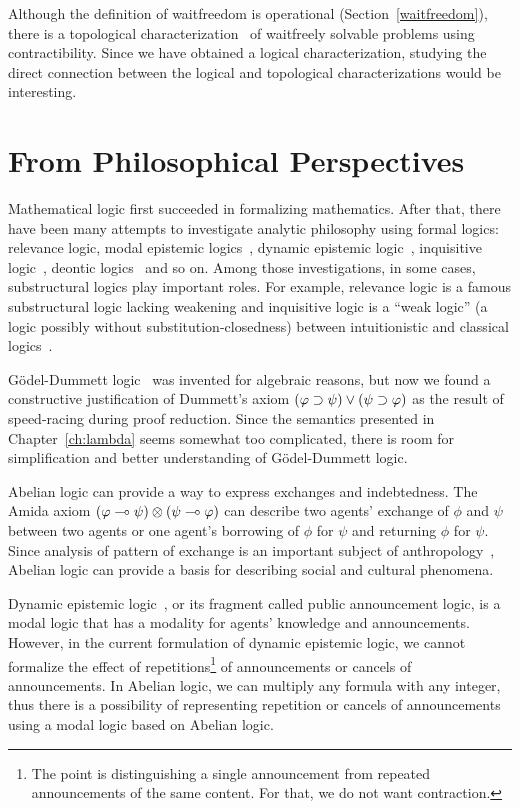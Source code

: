 Although the definition of waitfreedom is operational
(Section~\ref{waitfreedom}),
there is a topological characterization~\citep{Herlihy99,Saks:1993vq} of
waitfreely solvable problems using contractibility.
Since we have obtained a logical characterization, studying the direct
connection between the logical and topological characterizations would
be interesting.

\section{From Philosophical Perspectives}

Mathematical logic first succeeded in formalizing mathematics.
After that, there have been many attempts to investigate analytic
philosophy
using formal logics: relevance logic, modal epistemic
logics~\citep{sep-logic-epistemic},
dynamic epistemic logic~\citep{ditmarsch2007dynamic},
inquisitive logic~\citep{ciardelli2011},
deontic logics~\citep{von1951deontic} and
so on.  Among those investigations, in some cases, substructural logics
play important roles.  For example, relevance logic is a famous
substructural logic lacking weakening and inquisitive logic is a ``weak
logic'' (a logic possibly without substitution-closedness) between
intuitionistic and classical logics~\citep{ciardelli2011}.

G\"odel-Dummett logic~\citep{dummett59} was invented for algebraic
reasons, but now we found a constructive justification of Dummett's axiom
$(\varphi\supset\psi)\lor(\psi\supset\varphi)$ as the result of speed-racing during
proof reduction.  Since the semantics presented in
Chapter~\ref{ch:lambda} seems somewhat too complicated,
there is room for simplification and better understanding of
G\"odel-Dummett logic.

Abelian logic can provide a way to express
exchanges and indebtedness.
The Amida axiom $(\varphi\multimap
\psi)\otimes(\psi\multimap\varphi)$
can describe two agents' exchange of $\phi$ and $\psi$ between two agents
or one agent's borrowing of $\phi$ for $\psi$ and returning $\phi$ for
$\psi$.
Since analysis of pattern of exchange is an important subject of
anthropology~\citep{kula1920}, Abelian logic can provide a
basis for describing social and cultural phenomena.

Dynamic epistemic logic~\citep{ditmarsch2007dynamic}, or its fragment
called public announcement
logic, is a modal logic that has a modality for agents' knowledge and
announcements.  However, in the current formulation of dynamic epistemic
logic, we cannot formalize the effect of repetitions\footnote{The point
is distinguishing a single announcement from repeated announcements of
the same content.  For that, we do not want contraction.} of announcements or
cancels of announcements.  In Abelian logic, we can multiply any formula
with any integer, thus there is a possibility of representing repetition
or cancels of announcements using a modal logic based on Abelian logic.

